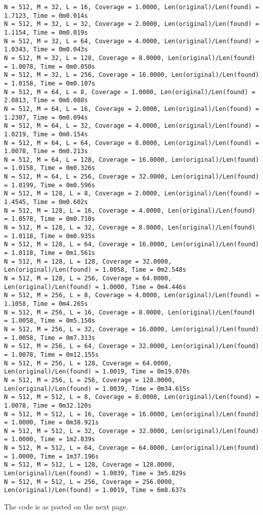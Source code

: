 \documentclass{article}
\begin{document}
{\begin{verbatim}
N = 512, M = 32, L = 16, Coverage = 1.0000, Len(original)/Len(found) = 1.7123, Time = 0m0.014s
N = 512, M = 32, L = 32, Coverage = 2.0000, Len(original)/Len(found) = 1.1154, Time = 0m0.019s
N = 512, M = 32, L = 64, Coverage = 4.0000, Len(original)/Len(found) = 1.0343, Time = 0m0.043s
N = 512, M = 32, L = 128, Coverage = 8.0000, Len(original)/Len(found) = 1.0078, Time = 0m0.050s
N = 512, M = 32, L = 256, Coverage = 16.0000, Len(original)/Len(found) = 1.0158, Time = 0m0.107s
N = 512, M = 64, L = 8, Coverage = 1.0000, Len(original)/Len(found) = 2.0813, Time = 0m0.088s
N = 512, M = 64, L = 16, Coverage = 2.0000, Len(original)/Len(found) = 1.2307, Time = 0m0.094s
N = 512, M = 64, L = 32, Coverage = 4.0000, Len(original)/Len(found) = 1.0219, Time = 0m0.154s
N = 512, M = 64, L = 64, Coverage = 8.0000, Len(original)/Len(found) = 1.0078, Time = 0m0.213s
N = 512, M = 64, L = 128, Coverage = 16.0000, Len(original)/Len(found) = 1.0158, Time = 0m0.326s
N = 512, M = 64, L = 256, Coverage = 32.0000, Len(original)/Len(found) = 1.0199, Time = 0m0.596s
N = 512, M = 128, L = 8, Coverage = 2.0000, Len(original)/Len(found) = 1.4545, Time = 0m0.602s
N = 512, M = 128, L = 16, Coverage = 4.0000, Len(original)/Len(found) = 1.0578, Time = 0m0.710s
N = 512, M = 128, L = 32, Coverage = 8.0000, Len(original)/Len(found) = 1.0118, Time = 0m0.935s
N = 512, M = 128, L = 64, Coverage = 16.0000, Len(original)/Len(found) = 1.0118, Time = 0m1.561s
N = 512, M = 128, L = 128, Coverage = 32.0000, Len(original)/Len(found) = 1.0058, Time = 0m2.548s
N = 512, M = 128, L = 256, Coverage = 64.0000, Len(original)/Len(found) = 1.0000, Time = 0m4.446s
N = 512, M = 256, L = 8, Coverage = 4.0000, Len(original)/Len(found) = 1.1058, Time = 0m4.265s
N = 512, M = 256, L = 16, Coverage = 8.0000, Len(original)/Len(found) = 1.0058, Time = 0m5.150s
N = 512, M = 256, L = 32, Coverage = 16.0000, Len(original)/Len(found) = 1.0058, Time = 0m7.313s
N = 512, M = 256, L = 64, Coverage = 32.0000, Len(original)/Len(found) = 1.0078, Time = 0m12.155s
N = 512, M = 256, L = 128, Coverage = 64.0000, Len(original)/Len(found) = 1.0019, Time = 0m19.070s
N = 512, M = 256, L = 256, Coverage = 128.0000, Len(original)/Len(found) = 1.0039, Time = 0m34.615s
N = 512, M = 512, L = 8, Coverage = 8.0000, Len(original)/Len(found) = 1.0078, Time = 0m32.120s
N = 512, M = 512, L = 16, Coverage = 16.0000, Len(original)/Len(found) = 1.0000, Time = 0m38.921s
N = 512, M = 512, L = 32, Coverage = 32.0000, Len(original)/Len(found) = 1.0000, Time = 1m2.839s
N = 512, M = 512, L = 64, Coverage = 64.0000, Len(original)/Len(found) = 1.0000, Time = 1m37.196s
N = 512, M = 512, L = 128, Coverage = 128.0000, Len(original)/Len(found) = 1.0039, Time = 3m5.829s
N = 512, M = 512, L = 256, Coverage = 256.0000, Len(original)/Len(found) = 1.0019, Time = 6m8.637s
\end{verbatim}
}
\clearpage
The code is as pasted on the next page.
\end{document}
